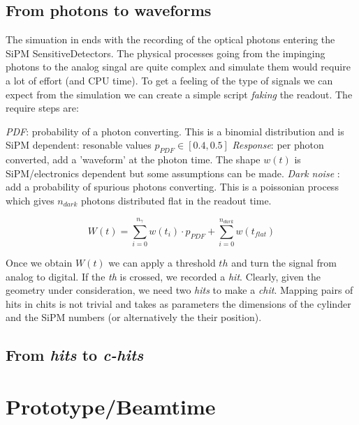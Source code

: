 \begin{refsection}
\subsection{From photons to waveforms}
The simuation in \gf ends with the recording of the optical photons entering the SiPM SensitiveDetectors.
The physical processes going from the impinging photons to the analog singal are quite complex and simulate them would require a lot of effort (and CPU time).
To get a feeling of the type of signals we can expect from the simulation we can create a simple script \textit{faking} the readout.
The require steps are:
\begin{outline}
    \1 \textit{PDF}: probability of a photon converting. 
    This is a binomial distribution and is SiPM dependent: resonable values $p_{PDF}\in [0.4, 0.5]$
    \1 \textit{Response}: per photon converted, add a 'waveform' at the photon time. 
    The shape $w(t)$ is SiPM/electronics dependent but some assumptions can be made.
    \1 \textit{Dark noise} : add a probability of spurious photons converting. 
    This is a poissonian process which gives $n_{dark}$ photons distributed flat in the readout time.
\end{outline}

\begin{equation}
    W(t)=\sum_{i=0}^{n_\gamma} w(t_i)\cdot p_{PDF} + \sum_{i=0}^{n_{dark}} w(t_{flat})
\end{equation}

Once we obtain $W(t)$ we can apply a threshold $th$ and turn the signal from analog to digital. 
If the \textit{th} is crossed, we recorded a \textit{hit}.
Clearly, given the geometry under consideration, we need two \textit{hits} to make a \textit{chit}.
Mapping pairs of hits in chits is not trivial and takes as parameters the dimensions of the cylinder and the SiPM numbers (or alternatively the their position).

\subsection{From \textit{hits} to \textit{c-hits}}

\section{Prototype/Beamtime}

\printbibliography[title=Bibliography on muEDM positron tracker]
\end{refsection}